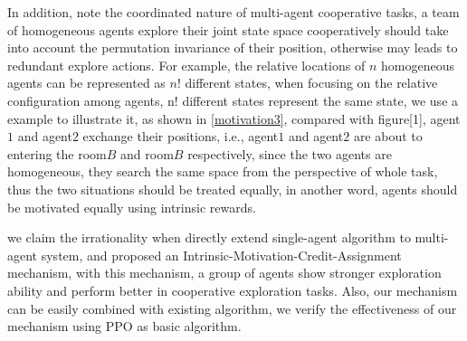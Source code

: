 \documentclass{article} %
\begin{document}
In addition, note the coordinated nature of multi-agent cooperative tasks, a team of homogeneous agents explore their joint state space cooperatively should take into account the permutation invariance of their position, otherwise may leads to redundant explore actions. For example, the relative locations of $n$ homogeneous agents can be represented as $n!$ different states, when focusing on the relative configuration among agents, n! different states represent the same state, we use a example to illustrate it, as shown in \ref{motivation3}, compared with figure[1], agent$1$ and agent$2$ exchange their positions, i.e., agent$1$ and agent$2$ are about to entering the room$B$ and room$B$ respectively, since the two agents are homogeneous, they search the same space from the perspective of whole task, thus the two situations should be treated equally, in another word, agents should be motivated equally using intrinsic rewards.

we claim the irrationality when directly extend single-agent algorithm to multi-agent system, and proposed an Intrinsic-Motivation-Credit-Assignment mechanism, with this mechanism, a group of agents show stronger exploration ability and perform better in cooperative exploration tasks. Also, our mechanism can be easily combined with existing algorithm, we verify the effectiveness of our mechanism using PPO as basic algorithm.
\end{document}
